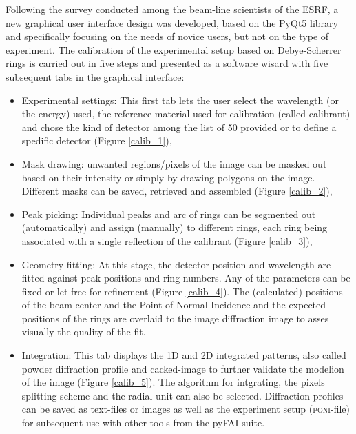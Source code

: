 \documentclass[preprint, pdf]{iucr}              %
\begin{document}
Following the survey conducted among the beam-line scientists of the ESRF, a
new graphical user interface design was developed, based on the PyQt5
library \cite{pyqt} and specifically focusing on the needs of novice users, but
not on the type of experiment.
The calibration of the experimental setup based on Debye-Scherrer rings 
is carried out in five steps and presented as a software wisard with five
subsequent tabs in the graphical interface:
\begin{itemize}
  \item{Experimental settings:} This first tab lets the user select
  the wavelength (or the energy) used, the reference material used
  for calibration (called calibrant) and chose the kind of detector among the
  list of 50 provided or to define a spedific detector (Figure \ref{calib_1}),
  \item{Mask drawing:} unwanted regions/pixels of the
  image can be masked out based on their intensity or simply by
  drawing polygons on the image. Different masks can be saved,
  retrieved and assembled (Figure \ref{calib_2}),
  \item{Peak picking:} Individual peaks and arc of rings can be segmented out
  (automatically) and assign (manually) to different rings, each ring 
  being associated with a single reflection of the calibrant (Figure
  \ref{calib_3}),
  \item{Geometry fitting:} At this stage, the detector position and
  wavelength are fitted against peak positions and ring numbers. 
  Any of the  parameters can be fixed or let free for refinement (Figure \ref{calib_4}).
  The (calculated) positions of the beam center and the Point of Normal
  Incidence and the expected positions of the rings are overlaid to the image
  diffraction image to asses visually the quality of the fit.
  \item{Integration:} This tab displays the  1D and 2D integrated patterns, also
  called powder diffraction profile and cacked-image to further validate the
  modelion of the image (Figure \ref{calib_5}). 
  The algorithm for intgrating, the pixels splitting scheme and the radial unit
  can also be selected. 
  Diffraction profiles can be saved as text-files or images as well as the
  experiment setup (\textsc{poni}-file) for subsequent use with other tools from
  the pyFAI suite.
\end{itemize}
\end{document}
